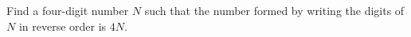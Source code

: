 Find a four-digit number $N$ such that the number formed by writing the digits of $N$ in reverse order is $4N$.
